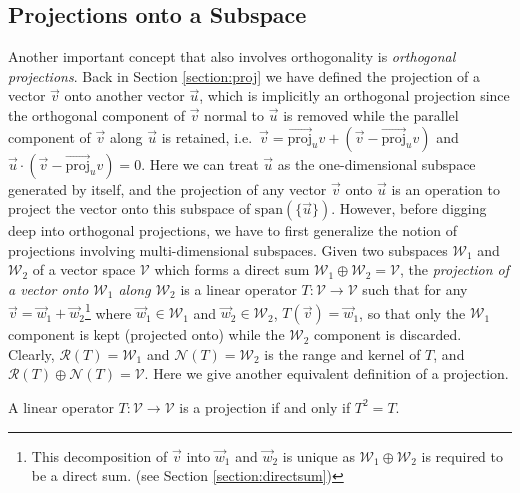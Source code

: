 \subsection{Projections onto a Subspace}

Another important concept that also involves orthogonality is \textit{orthogonal projections}. Back in Section \ref{section:proj} we have defined the projection of a vector $\vec{v}$ onto another vector $\vec{u}$, which is implicitly an orthogonal projection since the orthogonal component of $\vec{v}$ normal to $\vec{u}$ is removed while the parallel component of $\vec{v}$ along $\vec{u}$ is retained, i.e.\ $\vec{v} = \overrightarrow{\text{proj}}_u v + (\vec{v} - \overrightarrow{\text{proj}}_u v)$ and $\vec{u} \cdot (\vec{v} - \overrightarrow{\text{proj}}_u v) = 0$. Here we can treat $\vec{u}$ as the one-dimensional subspace generated by itself, and the projection of any vector $\vec{v}$ onto $\vec{u}$ is an operation to project the vector onto this subspace of $\text{span}(\{\vec{u}\})$. However, before digging deep into orthogonal projections, we have to first generalize the notion of projections involving multi-dimensional subspaces. Given two subspaces $\mathcal{W}_1$ and $\mathcal{W}_2$ of a vector space $\mathcal{V}$ which forms a direct sum $\mathcal{W}_1 \oplus \mathcal{W}_2 = \mathcal{V}$, the \textit{projection of a vector onto $\mathcal{W}_1$ along $\mathcal{W}_2$} is a linear operator $T: \mathcal{V} \to \mathcal{V}$ such that for any $\vec{v} = \vec{w}_1 + \vec{w}_2$\footnote{This decomposition of $\vec{v}$ into $\vec{w}_1$ and $\vec{w}_2$ is unique as $\mathcal{W}_1 \oplus \mathcal{W}_2$ is required to be a direct sum. (see Section \ref{section:directsum})} where $\vec{w}_1 \in \mathcal{W}_1$ and $\vec{w}_2 \in \mathcal{W}_2$, $T(\vec{v}) = \vec{w}_1$, so that only the $\mathcal{W}_1$ component is kept (projected onto) while the $\mathcal{W}_2$ component is discarded. Clearly, $\mathcal{R}(T) = \mathcal{W}_1$ and $\mathcal{N}(T) = \mathcal{W}_2$ is the range and kernel of $T$, and $\mathcal{R}(T) \oplus \mathcal{N}(T) = \mathcal{V}$. Here we give another equivalent definition of a projection.
\begin{proper}[Projection]
\label{proper:matrixproj}
A linear operator $T: \mathcal{V} \to \mathcal{V}$ is a projection if and only if $T^2 = T$.
\end{proper}
